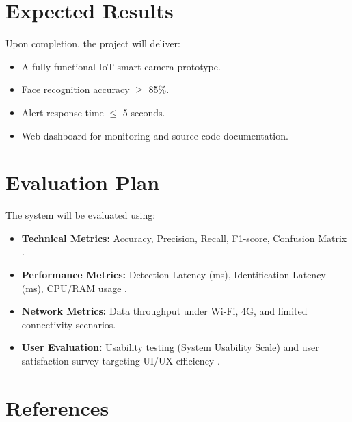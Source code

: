 \documentclass[12pt,a4paper]{article}
\begin{document}
\section{Expected Results}
Upon completion, the project will deliver:
\begin{itemize}
    \item A fully functional IoT smart camera prototype.
    \item Face recognition accuracy $\ge$ 85\%.
    \item Alert response time $\le$ 5 seconds.
    \item Web dashboard for monitoring and source code documentation.
\end{itemize}

\section{Evaluation Plan}
The system will be evaluated using:
\begin{itemize}
    \item \textbf{Technical Metrics:} Accuracy, Precision, Recall, F1-score, Confusion Matrix \cite{ijacsa_2020}.
    \item \textbf{Performance Metrics:} Detection Latency (ms), Identification Latency (ms), CPU/RAM usage \cite{sarimole_2024}.
    \item \textbf{Network Metrics:} Data throughput under Wi-Fi, 4G, and limited connectivity scenarios.
    \item \textbf{User Evaluation:} Usability testing (System Usability Scale) and user satisfaction survey targeting UI/UX efficiency \cite{haney_2025}.
\end{itemize}

\section{References}

\printbibliography
\end{document}
